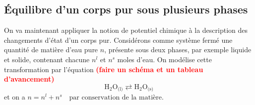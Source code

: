 \documentclass[11pt,a4paper]{report}
\begin{document}
%		
%	
%	

\subsection{Équilibre d'un corps pur sous plusieurs phases}

On va maintenant appliquer la notion de potentiel chimique à la description des changements d'état d'un corps pur. Considérons comme système fermé une quantité de matière d'eau pure $n$, présente sous deux phases, par exemple liquide et solide, contenant chacune $n^l$ et $n^s$ moles d'eau. On modélise cette transformation par l'équation \textcolor{red}{\textbf{(faire un schéma et un tableau d'avancement)}}
\begin{equation}
	\text{H}_2\text{O}_\text{(l)} \rightleftarrows \text{H}_2\text{O}_\text{(s)} 
\end{equation}
et on a $n = n^l + n^s \quad\text{par conservation de la matière}$.\\
	
\end{document}

